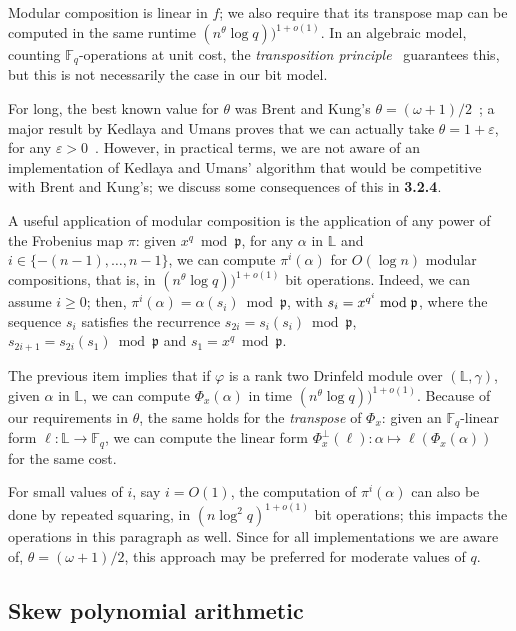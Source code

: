 \documentclass[sigconf]{acmart}
\newcommand{\F}{\mathbb{F}}
\renewcommand{\L}{\mathbb{L}}
\newcommand{\frakp}{\mathfrak{p}}
\begin{document}
Modular composition is linear in $f$; we also require that its
transpose map can be computed in the same runtime $(n^\theta
\log q))^{1+o(1)}$. In an algebraic model, counting $\F_q$-operations
at unit cost, the {\em transposition principle}~\cite{Kaltofen00}
guarantees this, but this is not necessarily the case in our bit
model.

For long, the best known value for $\theta$ was Brent and Kung's 
$\theta = (\omega+1)/2$~\cite{BrKu78}; a major result by Kedlaya and
Umans proves that we can actually take $\theta = 1+\varepsilon$, for any
$\varepsilon > 0$~\cite{Kedlaya:2011:FPF:2340436.2340448}. However, in
practical terms, we are not aware of an implementation of Kedlaya and
Umans' algorithm that would be competitive with Brent and Kung's;
we discuss some consequences of this in {\bf 3.2.4}.

\smallskip{}  A useful application of modular
composition is the application of any power of the Frobenius map
$\pi$: given $x^q \bmod \frakp$, for any $\alpha$ in $\L$ and $i \in
\{-(n-1),\dots,n-1\}$, we can compute $\pi^i(\alpha)$ for $O(\log n)$
modular compositions, that is, in $(n^\theta \log q))^{1+o(1)}$ bit
operations. Indeed, we can assume $i \ge 0$; then, $\pi^i(\alpha) =
\alpha(s_i) \bmod \frakp$, with $s_i = x^{q^i} \bmod \frak p$, where
the sequence $s_i$ satisfies the recurrence $s_{2i} = s_i(s_i) \bmod
\frakp$, $s_{2i+1} = s_{2i}(s_1) \bmod \frakp$ and $s_1 = x^q \bmod
\frakp$.

\smallskip{} The previous item implies that if
$\varphi$ is a rank two Drinfeld module over $(\L,\gamma)$, given
$\alpha$ in $\L$, we can compute $\Phi_x(\alpha)$ in time $(n^{\theta}
\log q))^{1+o(1)}$.  Because of our requirements in $\theta$, the same
holds for the {\em transpose} of $\Phi_x$: given an $\F_q$-linear form
$\ell:\L\to \F_q$, we can compute the linear form $\Phi_x^\perp(\ell):
\alpha\mapsto \ell(\Phi_x(\alpha))$ for the same cost.

For small values of $i$, say $i=O(1)$, the computation of
$\pi^i(\alpha)$ can also be done by repeated squaring, in $(n
\log^2 q)^{1+o(1)}$ bit operations; this impacts the operations in
this paragraph as well.  Since for all implementations we are aware
of, $\theta=(\omega+1)/2$, this approach may be preferred for moderate
values of $q$.



\subsection{Skew polynomial arithmetic}
\end{document}
